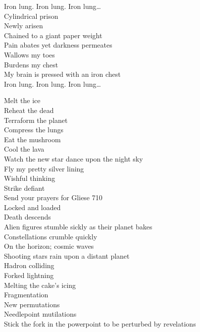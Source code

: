 Iron lung. Iron lung. Iron lung… \\

Cylindrical prison \\
Newly arisen \\
Chained to a giant paper weight \\
Pain abates yet darkness permeates \\
Wallows my toes \\
Burdens my chest \\
My brain is pressed with an iron chest \\

Iron lung. Iron lung. Iron lung… \\




Melt the ice \\
Reheat the dead \\
Terraform the planet \\
Compress the lungs \\
Eat the mushroom \\
Cool the lava \\
Watch the new star dance upon the night sky \\
Fly my pretty silver lining \\
Wishful thinking \\
Strike defiant \\
Send your prayers for Gliese 710 \\
Locked and loaded \\
Death descends \\

Alien figures stumble sickly as their planet bakes \\
Constellations crumble quickly \\
On the horizon; cosmic waves \\
Shooting stars rain upon a distant planet \\
Hadron colliding \\
Forked lightning \\
Melting the cake's icing \\

Fragmentation \\
New permutations \\
Needlepoint mutilations \\
Stick the fork in the powerpoint to be perturbed by revelations \\


